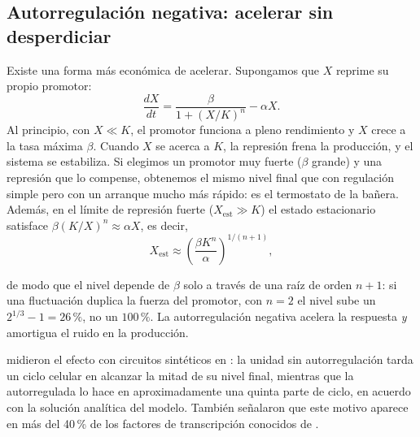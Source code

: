 \subsection{Autorregulación negativa: acelerar sin desperdiciar}

Existe una forma más económica de acelerar. Supongamos que $X$ reprime su propio promotor:
\begin{equation}\label{eq:16-nar}
\frac{dX}{dt}=\frac{\beta}{1+(X/K)^n}-\alpha X.
\end{equation}
Al principio, con $X\ll K$, el promotor funciona a pleno rendimiento y $X$ crece a la tasa máxima $\beta$. Cuando $X$ se acerca a $K$, la represión frena la producción, y el sistema se estabiliza. Si elegimos un promotor muy fuerte ($\beta$ grande) y una represión que lo compense, obtenemos el mismo nivel final que con regulación simple pero con un arranque mucho más rápido: es el termostato de la bañera. Además, en el límite de represión fuerte ($X_{\text{est}}\gg K$) el estado estacionario satisface $\beta(K/X)^n\approx\alpha X$, es decir,
\begin{equation}\label{eq:16-narest}
X_{\text{est}}\approx\left(\frac{\beta K^n}{\alpha}\right)^{1/(n+1)},
\end{equation}
\begin{simbolos}
\end{simbolos}
de modo que el nivel depende de $\beta$ solo a través de una raíz de orden $n+1$: si una fluctuación duplica la fuerza del promotor, con $n=2$ el nivel sube un $2^{1/3}-1=26\,\%$, no un $100\,\%$. La autorregulación negativa acelera la respuesta \emph{y} amortigua el ruido en la producción.

\textcite{c16-rosenfeld2002} midieron el efecto con circuitos sintéticos en : la unidad sin autorregulación tarda un ciclo celular en alcanzar la mitad de su nivel final, mientras que la autorregulada lo hace en aproximadamente una quinta parte de ciclo, en acuerdo con la solución analítica del modelo. También señalaron que este motivo aparece en más del 40\,\% de los factores de transcripción conocidos de .

